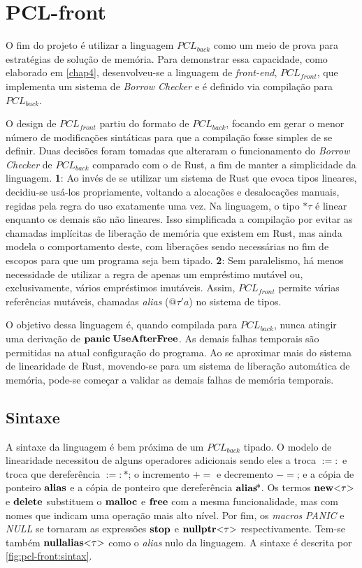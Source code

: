 \chapter{PCL-front}
\label{chap5}

O fim do projeto é utilizar a linguagem $PCL_{back}$ como um meio de prova para estratégias de solução de memória. Para demonstrar essa capacidade, como elaborado em \ref{chap4}, desenvolveu-se a linguagem de \emph{front-end}, $PCL_{front}$, que implementa um sistema de \emph{Borrow Checker} e é definido via compilação para $PCL_{back}$.

O design de $PCL_{front}$ partiu do formato de $PCL_{back}$, focando em gerar o menor número de modificações sintáticas para que a compilação fosse simples de se definir. Duas decisões foram tomadas que alteraram o funcionamento do \emph{Borrow Checker} de $PCL_{back}$ comparado com o de Rust, a fim de manter a simplicidade da linguagem. \textbf{1}: Ao invés de se utilizar um sistema de Rust que evoca tipos lineares, decidiu-se usá-los propriamente, voltando a alocações e desalocações manuais, regidas pela regra do uso exatamente uma vez. Na linguagem, o tipo $\text{*}\tau$ é linear enquanto os demais são não lineares. Isso simplificada a compilação por evitar as chamadas implícitas de liberação de memória que existem em Rust, mas ainda modela o comportamento deste, com liberações sendo necessárias no fim de escopos para que um programa seja bem tipado. \textbf{2}: Sem paralelismo, há menos necessidade de utilizar a regra de apenas um empréstimo mutável ou, exclusivamente, vários empréstimos imutáveis. Assim, $PCL_{front}$ permite várias referências mutáveis, chamadas \emph{alias} ($@\tau'a$) no sistema de tipos. 

O objetivo dessa linguagem é, quando compilada para $PCL_{back}$, nunca atingir uma derivação de $\mathbf{panic}\;\mathbf{UseAfterFree}$. As demais falhas temporais são permitidas na atual configuração do programa. Ao se aproximar mais do sistema de linearidade de Rust, movendo-se para um sistema de liberação automática de memória, pode-se começar a validar as demais falhas de memória temporais.

\section{Sintaxe}

A sintaxe da linguagem é bem próxima de um $PCL_{back}$ tipado. O modelo de linearidade necessitou de alguns operadores adicionais sendo eles a troca $:=:$ e troca que dereferência $:=:\!\text{*}$; o incremento $+=$ e decremento $-=$; e a cópia de ponteiro $\mathbf{alias}$ e a cópia de ponteiro que dereferência $\mathbf{alias}\!\text{*}$. Os termos $\mathbf{new}\text{<}\tau\text{>}$ e $\mathbf{delete}$ substituem o $\mathbf{malloc}$ e $\mathbf{free}$ com a mesma funcionalidade, mas com nomes que indicam uma operação mais alto nível. Por fim, os \emph{macros} \emph{PANIC} e \emph{NULL} se tornaram as expressões $\mathbf{stop}$ e $\mathbf{nullptr}\text{<}\tau\text{>}$ respectivamente. Tem-se também $\mathbf{nullalias}\text{<}\tau\text{>}$ como o \emph{alias} nulo da linguagem. A sintaxe é descrita por \ref{fig:pcl-front:sintax}.

